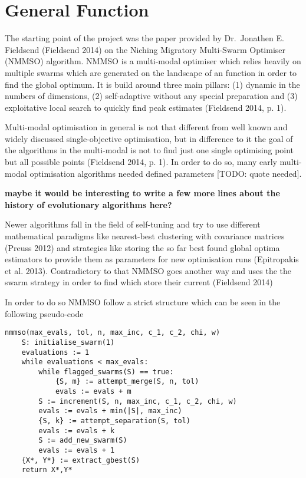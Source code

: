 \documentclass[12pt,a4paper]{article}
\begin{document}
\section{General Function}\label{general-function}

The starting point of the project was the paper provided by Dr.~Jonathen
E. Fieldsend (Fieldsend 2014) on the Niching Migratory Multi-Swarm
Optimiser (NMMSO) algorithm. NMMSO is a multi-modal optimiser which
relies heavily on multiple swarms which are generated on the landscape
of an function in order to find the global optimum. It is build around
three main pillars: (1) dynamic in the numbers of dimensions, (2)
self-adaptive without any special preparation and (3) exploitative local
search to quickly find peak estimates (Fieldsend 2014, p. 1).

Multi-modal optimisation in general is not that different from well
known and widely discussed single-objective optimisation, but in
difference to it the goal of the algorithms in the multi-modal is not to
find just one single optimising point but all possible points (Fieldsend
2014, p. 1). In order to do so, many early multi-modal optimisation
algorithms needed defined parameters {[}TODO: quote needed{]}.

\textbf{maybe it would be interesting to write a few more lines about
the history of evolutionary algorithms here?}

Newer algorithms fall in the field of self-tuning and try to use
different mathematical paradigms like nearest-best clustering with
covariance matrices (Preuss 2012) and strategies like storing the so far
best found global optima estimators to provide them as parameters for
new optimisation runs (Epitropakis et al. 2013). Contradictory to that
NMMSO goes another way and uses the the swarm strategy in order to find
which store their current (Fieldsend 2014)

In order to do so NMMSO follow a strict structure which can be seen in
the following pseudo-code

\begin{verbatim}
nmmso(max_evals, tol, n, max_inc, c_1, c_2, chi, w)
    S: initialise_swarm(1)
    evaluations := 1
    while evaluations < max_evals:
        while flagged_swarms(S) == true:
            {S, m} := attempt_merge(S, n, tol)
            evals := evals + m
        S := increment(S, n, max_inc, c_1, c_2, chi, w)
        evals := evals + min(|S|, max_inc)
        {S, k} := attempt_separation(S, tol)
        evals := evals + k
        S := add_new_swarm(S)
        evals := evals + 1
    {X*, Y*} := extract_gbest(S)
    return X*,Y*
\end{verbatim}
\end{document}
